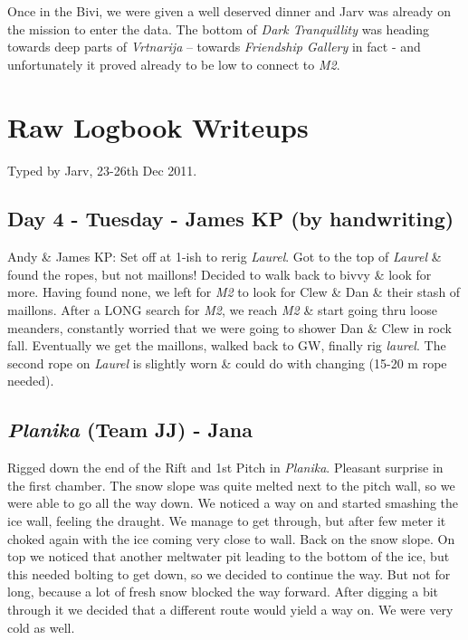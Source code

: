 Once in the Bivi, we were given a well deserved dinner and Jarv was
already on the mission to enter the data. The bottom of \emph{Dark
Tranquillity} was heading towards deep parts of \emph{Vrtnarija} --
towards \emph{Friendship Gallery} in fact - and unfortunately it proved
already to be low to connect to \emph{M2}.

\attrib{\izi}

\hypertarget{raw-logbook-writeups}{%
\section{Raw Logbook Writeups}\label{raw-logbook-writeups}}

Typed by Jarv, 23-26th Dec 2011.

\hypertarget{day-4---tuesday---james-kp-by-handwriting}{%
\subsection{Day 4 - Tuesday - James KP (by
handwriting)}\label{day-4---tuesday---james-kp-by-handwriting}}

Andy \& James KP: Set off at 1-ish to rerig \emph{Laurel}. Got to the
top of \emph{Laurel} \& found the ropes, but not maillons! Decided to
walk back to bivvy \& look for more. Having found none, we left for
\emph{M2} to look for Clew \& Dan \& their stash of maillons. After a
LONG search for \emph{M2}, we reach \emph{M2} \& start going thru loose
meanders, constantly worried that we were going to shower Dan \& Clew in
rock fall. Eventually we get the maillons, walked back to GW, finally
rig \emph{laurel}. The second rope on \emph{Laurel} is slightly worn \&
could do with changing (15-20 m rope needed).

\hypertarget{planika-team-jj---jana}{%
\subsection{\texorpdfstring{\emph{Planika} (Team JJ) -
Jana}{Planika (Team JJ) - Jana}}\label{planika-team-jj---jana}}

Rigged down the end of the Rift and 1st Pitch in \emph{Planika}.
Pleasant surprise in the first chamber. The snow slope was quite melted
next to the pitch wall, so we were able to go all the way down. We
noticed a way on and started smashing the ice wall, feeling the draught.
We manage to get through, but after few meter it choked again with the
ice coming very close to wall. Back on the snow slope. On top we noticed
that another meltwater pit leading to the bottom of the ice, but this
needed bolting to get down, so we decided to continue the way. But not
for long, because a lot of fresh snow blocked the way forward. After
digging a bit through it we decided that a different route would yield a
way on. We were very cold as well.

